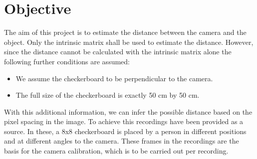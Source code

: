 \section{Objective}\label{obj}

The aim of this project is to estimate the distance between the camera and the object. Only the intrinsic matrix shall be used to estimate the distance. However, since the distance cannot be calculated with the intrinsic matrix alone the following further conditions are assumed:

\begin{itemize}
    \item We assume the checkerboard to be perpendicular to the camera.
    \item The full size of the checkerboard is exactly 50 cm by 50 cm.
\end{itemize}

With this additional information, we can infer the possible distance based on the pixel spacing in the image. To achieve this recordings have been provided as a source. In these, a 8x8 checkerboard is placed by a person in different positions and at different angles to the camera. These frames in the recordings are the basis for the camera calibration, which is to be carried out per recording.\\

